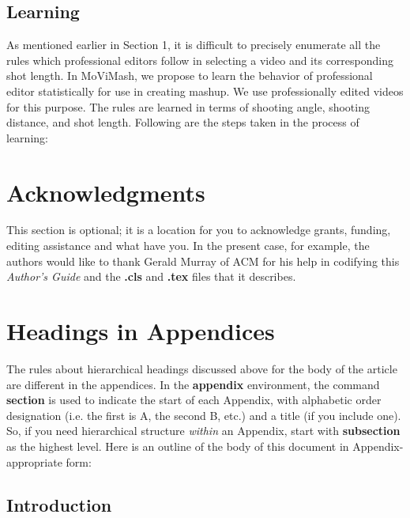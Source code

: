 \documentclass{sig-alternate-05-2015}
\begin{document}
\subsection{Learning}

As mentioned earlier in Section 1, it is difficult to precisely enumerate
all the rules which professional editors follow in selecting
a video and its corresponding shot length. In MoViMash, we propose
to learn the behavior of professional editor statistically for use
in creating mashup. We use professionally edited videos for this
purpose. The rules are learned in terms of shooting angle, shooting
distance, and shot length. Following are the steps taken in the
process of learning:

\section{Acknowledgments}
This section is optional; it is a location for you
to acknowledge grants, funding, editing assistance and
what have you.  In the present case, for example, the
authors would like to thank Gerald Murray of ACM for
his help in codifying this \textit{Author's Guide}
and the \textbf{.cls} and \textbf{.tex} files that it describes.

%

%
%
\appendix
\section{Headings in Appendices}
The rules about hierarchical headings discussed above for
the body of the article are different in the appendices.
In the \textbf{appendix} environment, the command
\textbf{section} is used to
indicate the start of each Appendix, with alphabetic order
designation (i.e. the first is A, the second B, etc.) and
a title (if you include one).  So, if you need
hierarchical structure
\textit{within} an Appendix, start with \textbf{subsection} as the
highest level. Here is an outline of the body of this
document in Appendix-appropriate form:
\subsection{Introduction}
\end{document}
